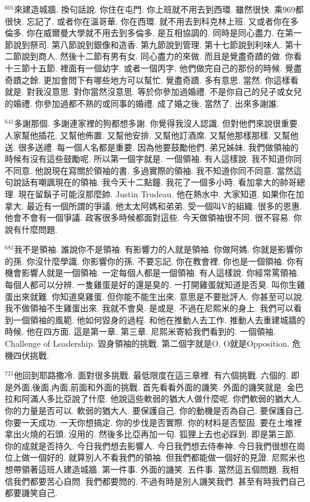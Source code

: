 \documentclass{book}
\begin{document}
$^{601}$來建造城牆.
換句話說.
你住在屯門.
你上班就不用去到西環.
雖然很快.
乘969都很快.
忘記了.
或者你在溫哥華.
你在西環.
就不用去到科克林上班.
又或者你在多倫多.
你在威爾曼大學就不用去到多倫多.
是互相協調的.
同時是同心盡力.
在第一節說到祭司.
第八節說到銀像和造香.
第九節說到管理.
第十七節說到利味人.
第十二節說到商人.
然後十二節有男有女.
同心盡力的來做.
而且是覺盡奇蹟的做.
你看十三節十五節.
裡面有一個幼字.
或者一個丙字.
他們做完自己的那份的時候.
覺盡奇蹟之餘.
更加會問下有哪些地方可以幫忙.
覺盡奇蹟.
多有意思.
當然.
你這樣看就是.
對我沒意思.
對你當然沒意思.
等於你參加過婚禮.
不是你自己的兒子或女兒的婚禮.
你參加過都不熟的或同事的婚禮.
成了婚之後.
當然了.
出來多謝誰.

$^{641}$多謝那個.
多謝連家裡的狗都想多謝.
你覺得我沒人認識.
但對他們來說很重要.
人家幫他插花.
又幫他佈置.
又幫他安排.
又幫他訂酒席.
又幫他那樣那樣.
又幫他送.
很多送禮.
每一個人名都是重要.
因為他要鼓勵他們.
弟兄姊妹.
我們做領袖的時候有沒有這些鼓勵呢.
所以第一個字就是.
一個領袖.
有人這樣說.
我不知道你同不同意.
他說現在寫關於領袖的書.
多過實際的領袖.
我不知道你同不同意.
當然這句說話有嘲諷現在的領袖.
我今天十二點鐘.
我花了一個多小時.
看加拿大的帥哥總理.
現在留鬍子可能沒那麼帥.
Justin Trudeau.
他在熱水中.
大家知道.
如果你在加拿大.
最近有一個所謂的爭議.
他太太阿媽和弟弟.
受一個叫V的組織.
很多的恩惠.
他會不會有一個爭議.
政客很多時候都面對這些.
今天做領袖很不同.
很不容易.
你說有什麼問題.

$^{681}$我不是領袖.
誰說你不是領袖.
有影響力的人就是領袖.
你做阿媽.
你就是影響你的孫.
你沒什麼學識.
你影響你的孫.
不要忘記.
你在教會裡.
你也是一個領袖.
你有機會影響人就是一個領袖.
一定每個人都是一個領袖.
有人這樣說.
你經常罵領袖.
每個人都可以分辨.
一隻雞蛋是好的還是臭的.
一打開雞蛋就知道是否臭.
叫你生雞蛋出來就難.
你知道臭雞蛋.
但你能不能生出來.
意思是不要批評人.
你甚至可以說.
我不做領袖不生雞蛋出來.
我就不會臭.
是或是.
不過在尼熙米的身上.
我們可以看到一個領袖的風範.
他如何毀身的過程.
和他在推動人去工作.
推動人去重建城牆的時候.
他在四方面.
這是第一章.
第三章.
尼熙米寄給我們看到的.
一個領袖.
Challenge of Leadership.
毀身領袖的挑戰.
第二個字就是O.
O就是Opposition.
危機四伏挑戰.

$^{721}$他回到耶路撒冷.
面對很多挑戰.
最低限度在這三章裡.
有六個挑戰.
六個的.
即是外面,後面,內面,前面和外面的挑戰.
首先看看外面的譏笑.
外面的譏笑就是.
金巴拉和阿滿人多比亞說了什麼.
他說這些軟弱的猶大人做什麼呢.
你們軟弱的猶大人.
你的力量是否可以.
軟弱的猶大人.
要保護自己.
你的動機是否為自己.
要保護自己.
你要一天成功.
一天你想搞定.
你的步伐是否實際.
你的材料是否堅固.
要在土堆裡拿出火燒的石頭.
沒用的.
然後多比亞再加一句.
狐狸上去也必踩到.
即是第三節.
你的成就是否持久.
今日我們想去影響人.
今日我們想去侍奉神.
今日我們很想在崗位上做一個好的.
就算別人不看我們的領袖.
但我們都能做一個好的見證.
尼熙米也想帶領著這班人建造城牆.
第一件事.
外面的譏笑.
五件事.
當然這五個問題.
我相信我們都要苦心自問.
我們都要問的.
不過有時是別人譏笑我們.
甚至有時我們自己都要譏笑自己.
\end{document}
